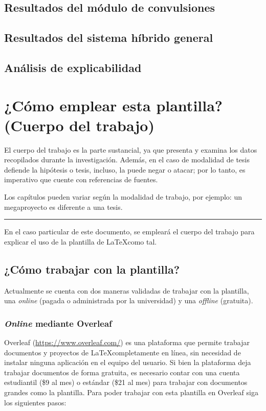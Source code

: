 \section{Resultados del módulo de convulsiones}
\section{Resultados del sistema híbrido general}
\section{Análisis de explicabilidad}

\chapter{¿Cómo emplear esta plantilla? (Cuerpo del trabajo)}

El cuerpo del trabajo es la parte sustancial, ya que presenta y examina los datos recopilados durante la investigación. Además, en el caso de modalidad de tesis defiende la hipótesis o tesis, incluso, la puede negar o atacar; por lo tanto, es imperativo que cuente con referencias de fuentes.  

Los capítulos pueden variar según la modalidad de trabajo, por ejemplo: un megaproyecto es diferente a una tesis.

\noindent\rule{\linewidth}{0.4pt}

En el caso particular de este documento, se empleará el cuerpo del trabajo para explicar el uso de la plantilla de \LaTeX como tal. 

\section{¿Cómo trabajar con la plantilla?}

Actualmente se cuenta con dos maneras validadas de trabajar con la plantilla, una \textit{online} (pagada o administrada por la universidad) y una \textit{offline} (gratuita).

\subsection{\textit{Online} mediante Overleaf}

Overleaf (\href{https://www.overleaf.com/}{https://www.overleaf.com/}) es una plataforma que permite trabajar documentos y proyectos de \LaTeX completamente en línea, sin necesidad de instalar ninguna aplicación en el equipo del usuario. Si bien la plataforma deja trabajar documentos de forma gratuita, es necesario contar con una cuenta estudiantil (\$9 al mes) o estándar (\$21 al mes) para trabajar con documentos grandes como la plantilla. Para poder trabajar con esta plantilla en Overleaf siga los siguientes pasos:

